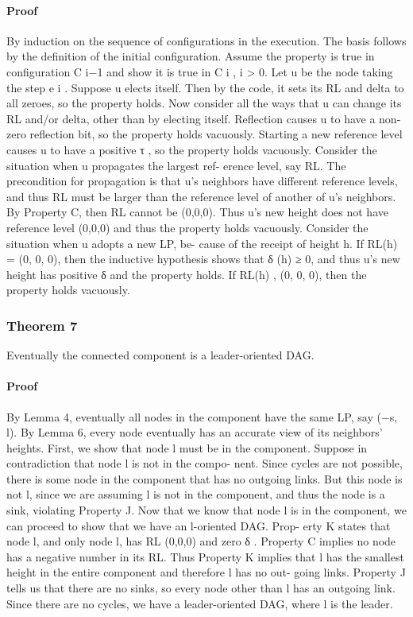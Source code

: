 \documentclass{article}
\begin{document}
\paragraph{Proof}
By induction on the sequence of configurations in
the execution. The basis follows by the definition of the
initial configuration.
Assume the property is true in configuration C i−1 and
show it is true in C i , i > 0. Let u be the node taking the step
e i .
Suppose u elects itself. Then by the code, it sets its RL
and delta to all zeroes, so the property holds.
Now consider all the ways that u can change its RL
and/or delta, other than by electing itself. Reflection causes
u to have a non-zero reflection bit, so the property holds
vacuously. Starting a new reference level causes u to have a
positive τ , so the property holds vacuously.
Consider the situation when u propagates the largest ref-
erence level, say RL. The precondition for propagation is
that u’s neighbors have different reference levels, and thus
RL must be larger than the reference level of another of u’s
neighbors. By Property C, then RL cannot be (0,0,0). Thus
u’s new height does not have reference level (0,0,0) and thus
the property holds vacuously.
Consider the situation when u adopts a new LP, be-
cause of the receipt of height h. If RL(h) = (0, 0, 0), then
the inductive hypothesis shows that δ (h) ≥ 0, and thus
u’s new height has positive δ and the property holds. If
RL(h) , (0, 0, 0), then the property holds vacuously.


\subsubsection{Theorem 7}
Eventually the connected component is a
leader-oriented DAG.
\paragraph{Proof}
By Lemma 4, eventually all nodes in the component
have the same LP, say (−s, l). By Lemma 6, every node
eventually has an accurate view of its neighbors’ heights.
First, we show that node l must be in the component.
Suppose in contradiction that node l is not in the compo-
nent. Since cycles are not possible, there is some node in
the component that has no outgoing links. But this node is
not l, since we are assuming l is not in the component, and
thus the node is a sink, violating Property J.
Now that we know that node l is in the component, we
can proceed to show that we have an l-oriented DAG. Prop-
erty K states that node l, and only node l, has RL (0,0,0) and
zero δ . Property C implies no node has a negative number
in its RL. Thus Property K implies that l has the smallest
height in the entire component and therefore l has no out-
going links. Property J tells us that there are no sinks, so
every node other than l has an outgoing link. Since there
are no cycles, we have a leader-oriented DAG, where l is
the leader.
\end{document}
